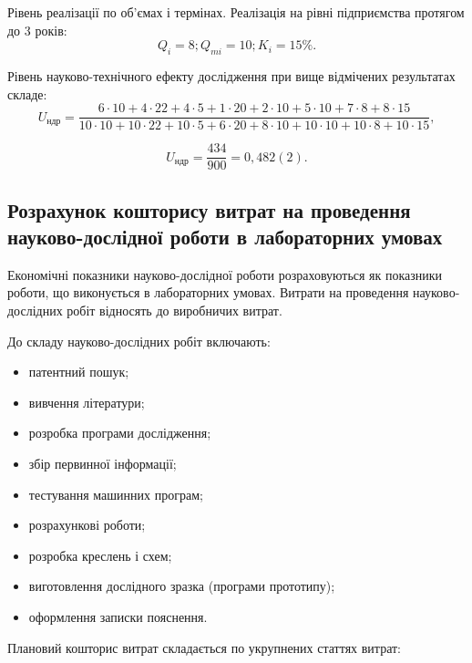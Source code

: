 \begin{longEnumerate}
\item Рівень реалізації по об'ємах і термінах. Реалізація на рівні підприємства протягом до 3 років:
\begin{equation}
Q_i = 8; Q_{mi} = 10; K_i = 15\%. \nonumber
\end{equation}

\item Рівень науково-технічного ефекту дослідження при вище відмічених результатах складе:
\begin{equation}
U_{\text{ндр}} = \frac{6  \cdot  10+4  \cdot  22+4  \cdot  5+1  \cdot  20+2  \cdot  10+5  \cdot  10+7  \cdot  8+8  \cdot  15}{10  \cdot  10+10  \cdot  22+10  \cdot  5+6  \cdot  20+8  \cdot  10+10  \cdot  10+10  \cdot  8+10  \cdot  15}, \nonumber
\end{equation}

\begin{equation}
U_{\text{ндр}} = \frac{434}{900} = 0,482(2).  \nonumber
\end{equation}
\end{longEnumerate}
  
    \subsection{Розрахунок кошторису витрат на проведення науково-дослідної роботи в лабораторних умовах}

Економічні показники науково-дослідної роботи розраховуються як показники роботи, що виконується в лабораторних умовах. Витрати на проведення науково-дослідних робіт відносять до виробничих витрат.

До складу науково-дослідних робіт включають:
\begin{itemize}
\item патентний пошук;
\item вивчення літератури;
\item розробка програми дослідження;
\item збір первинної інформації;
\item тестування машинних програм;
\item розрахункові роботи;
\item розробка креслень і схем;
\item виготовлення дослідного зразка (програми прототипу);
\item оформлення записки пояснення.
\end{itemize}

Плановий кошторис витрат складається по укрупнених статтях витрат:

